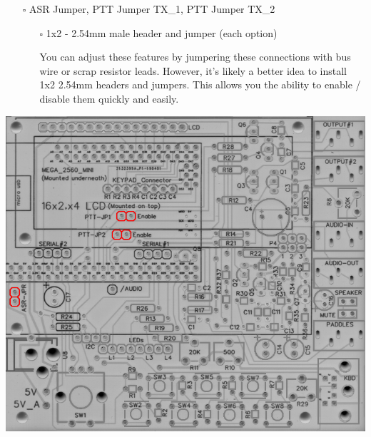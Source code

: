 \documentclass[11pt]{article}
\begin{document}
\newpage
\begin{itemize}
\item[{$\square$}] ASR Jumper, PTT Jumper TX\_1, PTT Jumper TX\_2
\begin{itemize}
\item[{$\square$}] 1x2 - 2.54mm male header and jumper (each option)

You can adjust these features by jumpering these connections with bus wire or scrap resistor leads.  However, it's likely a better idea to install 1x2 2.54mm headers and jumpers.  This allows you the ability to enable / disable them quickly and easily.
\end{itemize}
\end{itemize}
\begin{center}
\includegraphics[width=.9\linewidth]{../png/3.5/pcb-top-asr-ptt1-ptt2-jumpers.png}
\end{center}
\end{document}
